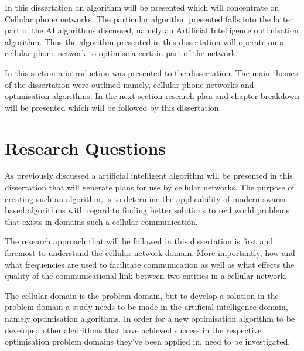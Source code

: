 In this dissertation an algorithm will be presented which will concentrate on Cellular phone networks. The particular algorithm presented falls into the latter part of the AI algorithms discussed, namely an Artificial Intelligence optimisation algorithm. Thus the algorithm presented in this dissertation will operate on a cellular phone network to optimise a certain part of the network.

In this section a introduction was presented to the dissertation. The main themes of the dissertation were outlined namely, cellular phone networks and optimisation algorithms. In the next section research plan and chapter breakdown will be presented which will be followed by this dissertation.
\section{Research Questions}
As previously discussed a artificial intelligent algorithm will be presented in this dissertation that will generate plans for use by cellular networks. The purpose of creating such an algorithm, is to determine the applicability of modern swarm based algorithms with regard to finding better solutions to real world problems that exists in domains such a cellular communication.

The research approach that will be followed in this dissertation is first and foremost to understand the cellular network domain. More importantly, how and what frequencies are used to facilitate communication as well as what effects the quality of the communicational link between two entities in a cellular network. 

The cellular domain is the problem domain, but to develop a solution in the problem domain a study needs to be made in the artificial intelligence domain, namely optimisation algorithms. In order for a new optimisation algorithm to be developed other algorithms that have achieved success in the respective optimisation problem domains they've been applied in, need to be investigated.

